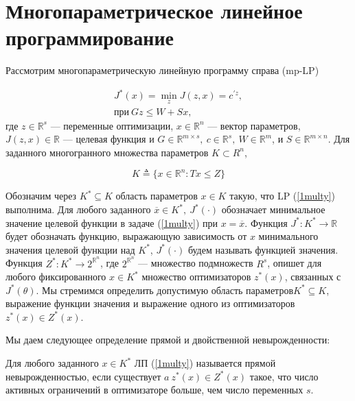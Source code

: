 \section{Многопараметрическое линейное программирование}\label{2sec:darova}

Рассмотрим многопараметрическую линейную программу справа (mp-LP)

\begin{equation}\label{1multy}
    \begin{split}
        J^*(x) = \min_z J(z,x) = c^{'z},\\
        \text{при}\ Gz \leq W + Sx,
    \end{split}
\end{equation}
где $z \in \mathbb{R}^s$ --- переменные оптимизации, $x \in \mathbb{R}^{n}$ --- вектор параметров, $J(z, x) \in \mathbb{R}$ --- целевая функция и $G \in \mathbb{R}^{m \times s},\ c \in \mathbb{R}^{s},\ W \in \mathbb{R}^{m}$, и $S \in \mathbb{R}^{m \times n}$. Для заданного многогранного множества параметров $K \subset R^{n}$,

\begin{equation}\label{2multy}
    K \triangleq \{ x \in \mathbb{R}^{n} : Tx \leq Z \}
\end{equation}

Обозначим через $K^* \subseteq K$ область параметров $x \in K$ такую, что LP (\ref{1multy}) выполнима. Для любого заданного $\overline{x} \in K^*,\ J^*(\cdot)$ обозначает минимальное значение целевой функции в задаче (\ref{1multy}) при $x = \overline{x}$. Функция $J^*: K^* \to \mathbb{R}$ будет обозначать функцию, выражающую зависимость от $x$ минимального значения целевой функции над $K^*$, $J^*(\cdot)$ будем называть функцией значения.
Функция $Z^*: K^* \to 2^{\mathbb{R}^{n}}$, где $2^{\mathbb{R}^{n}}$ --- множество подмножеств $R^{s}$, опишет для любого фиксированного $x \in K^*$ множество оптимизаторов $z^* (x)$, связанных с $J^*(\theta)$. 
Мы стремимся определить допустимую область параметров$K^* \subseteq K$, выражение функции значения и выражение одного из оптимизаторов $z^* (x) \in Z^* (x)$.

Мы даем следующее определение прямой и двойственной невырожденности:

\begin{definition}
    Для любого заданного $x \in K^*$ ЛП (\ref{1multy}) называется прямой невырожденностью, если существует $a\ z^* (x) \in Z^* (x)$ такое, что число активных ограничений в оптимизаторе больше, чем число переменных $s$.
\end{definition}

